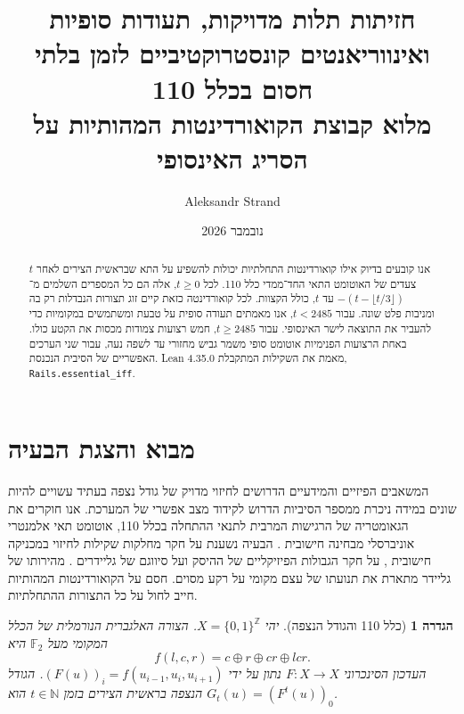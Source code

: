 \documentclass[11pt,a4paper]{article}
\title{\vspace{-1cm}\textbf{חזיתות תלות מדויקות, תעודות סופיות\texorpdfstring{\\}{} ואינווריאנטים קונסטרוקטיביים לזמן בלתי חסום בכלל 110}\\[0.55em]
{\large מלוא קבוצת הקואורדינטות המהותיות על הסריג האינסופי}}
\author{\textenglish{Aleksandr Strand}}
\date{נובמבר 2026}
\DeclareRobustCommand{\textenglish}[1]{\foreignlanguage{english}{#1}}
\newtheorem{definition}[theorem]{הגדרה}
\begin{document}
\sloppy
\maketitle
\thispagestyle{plain}

\begin{abstract}
אנו קובעים בדיוק אילו קואורדינטות התחלתיות יכולות להשפיע על התא שבראשית הצירים לאחר $t$ צעדים של האוטומט התאי החד־ממדי כלל 110. לכל $t\ge0$, אלה הם כל המספרים השלמים מ־$-(t-\lfloor t/3\rfloor)$ עד $t$, כולל הקצוות. לכל קואורדינטה כזאת קיים זוג תצורות הנבדלות רק בה ומניבות פלט שונה. עבור $t<2485$, אנו מאמתים תעודה סופית על טבעת ומשתמשים במקומיות כדי להעביר את התוצאה לישר האינסופי. עבור $t\ge2485$, חמש רצועות צמודות מכסות את הקטע כולו. באחת הרצועות הפנימיות אוטומט סופי משמר גביש מחזורי עד לשפה נעה, עבור שני הערכים האפשריים של הסיבית הנכנסת. \textenglish{Lean 4.35.0} מאמת את השקילות המתקבלת, \texttt{\textenglish{Rails.essential\_iff}}.
\end{abstract}

\tableofcontents
\vspace{1em}

\section{מבוא והצגת הבעיה}

המשאבים הפיזיים והמידעיים הדרושים לחיזוי מדויק של גודל נצפה בעתיד עשויים להיות שונים במידה ניכרת ממספר הסיביות הדרוש לקידוד מצב אפשרי של המערכת. אנו חוקרים את הגאומטריה של הרגישות המרבית לתנאי ההתחלה בכלל 110, אוטומט תאי אלמנטרי אוניברסלי מבחינה חישובית \cite{cook2004}. הבעיה נשענת על חקר מחלקות שקילות לחיזוי במכניקה חישובית \cite{shalizi2001}, על חקר הגבולות הפיזיקליים של ההיסק \cite{wolpert2008} ועל סיווגם של גליידרים \cite{wolfram1986, martinez2006}. מהירותו של גליידר מתארת את תנועתו של עצם מקומי על רקע מסוים. חסם על הקואורדינטות המהותיות חייב לחול על כל התצורות ההתחלתיות.

\begin{definition}[כלל 110 והגודל הנצפה]
יהי $X = \{0, 1\}^{\mathbb{Z}}$. הצורה האלגברית הנורמלית של הכלל המקומי מעל $\mathbb{F}_2$ היא
\begin{equation}\label{eq:rule110}
f(l, c, r) = c \oplus r \oplus cr \oplus lcr.
\end{equation}
העדכון הסינכרוני $F : X \to X$ נתון על ידי $(F(u))_i = f(u_{i-1}, u_i, u_{i+1})$. הגודל הנצפה בראשית הצירים בזמן $t \in \mathbb{N}$ הוא $G_t(u) = (F^t(u))_0$.
\end{definition}
\end{document}
